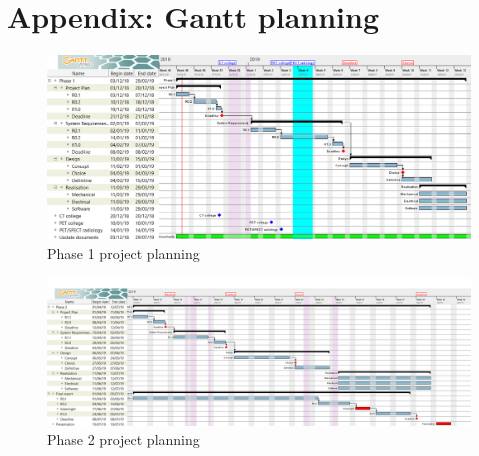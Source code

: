 \chapter{Appendix: Gantt planning} \label{app:ganttplan}
\begin{figure}[h!t]
	\begin{center}
		\includegraphics[width=\textwidth]{images/plan_phase1.png}
	\end{center}
	\caption{Phase 1 project planning}
	\label{fig:plan_phase1}
\end{figure}

\begin{figure}[h!t]
	\begin{center}
		\includegraphics[width=\textwidth]{images/plan_phase2_R2.png}
	\end{center}
	\caption{Phase 2 project planning}
	\label{fig:plan_phase2}
\end{figure}
